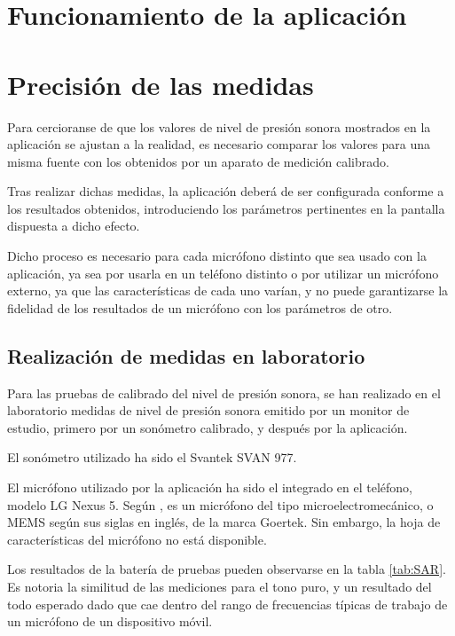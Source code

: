 \label{chp:App}
\section{Funcionamiento de la aplicación}


\section{Precisión de las medidas}
Para cercioranse de que los valores de nivel de presión sonora mostrados en la aplicación se ajustan a la realidad, es necesario comparar los valores para una misma fuente con los obtenidos por un aparato de medición calibrado.

Tras realizar dichas medidas, la aplicación deberá de ser configurada conforme a los resultados obtenidos, introduciendo los parámetros pertinentes en la pantalla dispuesta a dicho efecto.

Dicho proceso es necesario para cada micrófono distinto que sea usado con la aplicación, ya sea por usarla en un teléfono distinto o por utilizar un micrófono externo, ya que las características de cada uno varían, y no puede garantizarse la fidelidad de los resultados de un micrófono con los parámetros de otro.
\subsection{Realización de medidas en laboratorio}
Para las pruebas de calibrado del nivel de presión sonora, se han realizado en el laboratorio medidas de nivel de presión sonora emitido por un monitor de estudio, primero por un sonómetro calibrado, y después por la aplicación.

El sonómetro utilizado ha sido el Svantek SVAN 977.

El micrófono utilizado por la aplicación ha sido el integrado en el teléfono, modelo LG Nexus 5. Según \cite{n5-svcman}, es un micrófono del tipo microelectromecánico, o MEMS según sus siglas en inglés, de la marca Goertek. Sin embargo, la hoja de características del micrófono no está disponible.

Los resultados de la batería de pruebas pueden observarse en la tabla \ref{tab:SAR}. Es notoria la similitud de las mediciones para el tono puro, y un resultado del todo esperado dado que cae dentro del rango de frecuencias típicas de trabajo de un micrófono de un dispositivo móvil.

